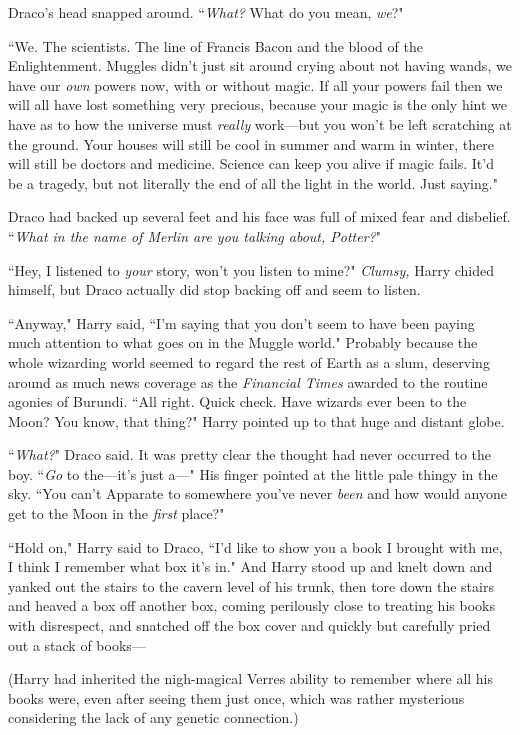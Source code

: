 Draco's head snapped around. ``\emph{What?} What do you mean, \emph{we}?"

``We. The scientists. The line of Francis Bacon and the blood of the Enlightenment. Muggles didn't just sit around crying about not having wands, we have our \emph{own} powers now, with or without magic. If all your powers fail then we will all have lost something very precious, because your magic is the only hint we have as to how the universe must \emph{really} work—but you won't be left scratching at the ground. Your houses will still be cool in summer and warm in winter, there will still be doctors and medicine. Science can keep you alive if magic fails. It'd be a tragedy, but not literally the end of all the light in the world. Just saying."

Draco had backed up several feet and his face was full of mixed fear and disbelief. ``\emph{What in the name of Merlin are you talking about, Potter?}"

``Hey, I listened to \emph{your} story, won't you listen to mine?" \emph{Clumsy,} Harry chided himself, but Draco actually did stop backing off and seem to listen.

``Anyway," Harry said, ``I'm saying that you don't seem to have been paying much attention to what goes on in the Muggle world." Probably because the whole wizarding world seemed to regard the rest of Earth as a slum, deserving around as much news coverage as the \emph{Financial Times} awarded to the routine agonies of Burundi. ``All right. Quick check. Have wizards ever been to the Moon? You know, that thing?" Harry pointed up to that huge and distant globe.

``\emph{What?}" Draco said. It was pretty clear the thought had never occurred to the boy. ``\emph{Go} to the—it's just a—" His finger pointed at the little pale thingy in the sky. ``You can't Apparate to somewhere you've never \emph{been} and how would anyone get to the Moon in the \emph{first} place?"

``Hold on," Harry said to Draco, ``I'd like to show you a book I brought with me, I think I remember what box it's in." And Harry stood up and knelt down and yanked out the stairs to the cavern level of his trunk, then tore down the stairs and heaved a box off another box, coming perilously close to treating his books with disrespect, and snatched off the box cover and quickly but carefully pried out a stack of books—

(Harry had inherited the nigh-magical Verres ability to remember where all his books were, even after seeing them just once, which was rather mysterious considering the lack of any genetic connection.)

